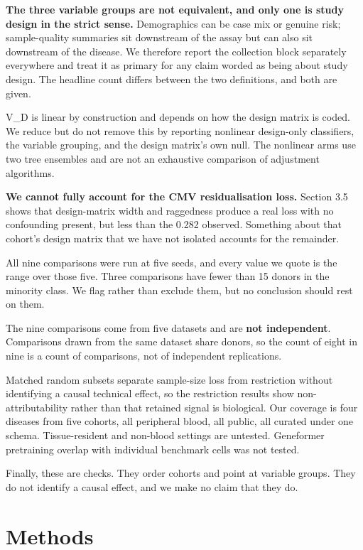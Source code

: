 \textbf{The three variable groups are not equivalent, and only one is study design in the strict sense.} Demographics can be case mix or genuine risk; sample-quality summaries sit downstream of the assay but can also sit downstream of the disease. We therefore report the collection block separately everywhere and treat it as primary for any claim worded as being about study design. The headline count differs between the two definitions, and both are given.

V\_D is linear by construction and depends on how the design matrix is coded. We reduce but do not remove this by reporting nonlinear design-only classifiers, the variable grouping, and the design matrix's own null. The nonlinear arms use two tree ensembles and are not an exhaustive comparison of adjustment algorithms.

\textbf{We cannot fully account for the CMV residualisation loss.} Section 3.5 shows that design-matrix width and raggedness produce a real loss with no confounding present, but less than the 0.282 observed. Something about that cohort's design matrix that we have not isolated accounts for the remainder.

All nine comparisons were run at five seeds, and every value we quote is the range over those five. Three comparisons have fewer than 15 donors in the minority class. We flag rather than exclude them, but no conclusion should rest on them.

The nine comparisons come from five datasets and are \textbf{not independent}. Comparisons drawn from the same dataset share donors, so the count of eight in nine is a count of comparisons, not of independent replications.

Matched random subsets separate sample-size loss from restriction without identifying a causal technical effect, so the restriction results show non-attributability rather than that retained signal is biological. Our coverage is four diseases from five cohorts, all peripheral blood, all public, all curated under one schema. Tissue-resident and non-blood settings are untested. Geneformer pretraining overlap with individual benchmark cells was not tested.

Finally, these are checks. They order cohorts and point at variable groups. They do not identify a causal effect, and we make no claim that they do.

\section{Methods}\label{methods}

